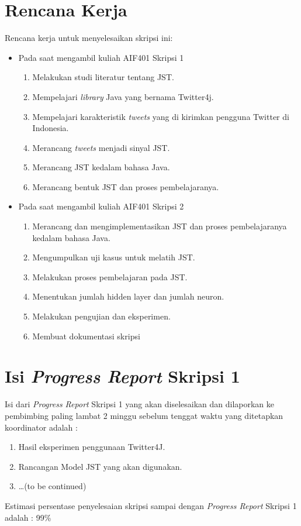 \documentclass[a4paper,twoside]{article}
\begin{document}
\section{Rencana Kerja}
Rencana kerja untuk menyelesaikan skripsi ini:
\begin{itemize}
	\item Pada saat mengambil kuliah AIF401 Skripsi 1
	\begin{enumerate}
		\item Melakukan studi literatur tentang JST.
		\item Mempelajari \textit{library} Java yang bernama Twitter4j.
		\item Mempelajari karakteristik \textit{tweets} yang di kirimkan pengguna Twitter di Indonesia.
		\item Merancang \textit{tweets} menjadi sinyal JST.
		\item Merancang JST kedalam bahasa Java.
		\item Merancang bentuk JST dan proses pembelajaranya.
	\end{enumerate}
	\item Pada saat mengambil kuliah AIF401 Skripsi 2
	\begin{enumerate}
		\item Merancang dan mengimplementasikan JST dan proses pembelajaranya kedalam bahasa Java.
		\item Mengumpulkan uji kasus untuk melatih JST.
		\item Melakukan proses pembelajaran pada JST.
		\item Menentukan jumlah hidden layer dan jumlah neuron.
		\item Melakukan pengujian dan eksperimen.
		\item Membuat dokumentasi skripsi
	\end{enumerate}
\end{itemize}

\section{Isi {\it Progress Report} Skripsi 1}
Isi dari {\it Progress Report} Skripsi 1 yang akan diselesaikan dan dilaporkan ke pembimbing paling lambat 2 minggu sebelum tenggat waktu yang ditetapkan koordinator adalah :
\begin{enumerate}
	\item Hasil eksperimen penggunaan Twitter4J.
	\item Rancangan Model JST yang akan digunakan.
	\item \ldots (to be continued)
\end{enumerate}
Estimasi persentase penyelesaian skripsi sampai dengan {\it Progress Report} Skripsi 1 adalah : 99\%
\end{document}
